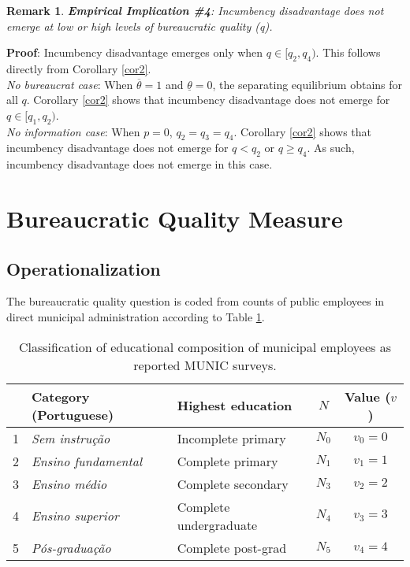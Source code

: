 \documentclass[11pt,english]{article}
\newtheorem{remark}{Remark}
\begin{document}
\begin{remark}
\textbf{Empirical Implication \#4}: Incumbency disadvantage does not emerge at low or high levels of bureaucratic quality (q).
\end{remark}

\textbf{Proof}: Incumbency disadvantage emerges only when $q \in [q_2, q_4)$. This follows directly from Corollary \ref{cor2}. \\

\emph{No bureaucrat case}: When $\overline{\theta} = 1$ and $\underline{\theta} = 0$, the separating equilibrium obtains for all $q$. Corollary \ref{cor2} shows that incumbency disadvantage does not emerge for $q \in [q_1, q_2)$.\\

\emph{No information case}: When $p=0$, $q_2=q_3=q_4$. Corollary \ref{cor2} shows that incumbency disadvantage does not emerge for $q < q_2$ or $q\geq q_4$. As such, incumbency disadvantage does not emerge in this case. 

\section{Bureaucratic Quality Measure}
\subsection{Operationalization}
The bureaucratic quality question is coded from counts of public employees in direct municipal administration according to Table \ref{tab:classification}.
\begin{table}[H]
\centering
\begin{tabular}{lllcc}\hline
& Category (Portuguese) &Highest education & $N$ & Value ($v$)\\ \hline \hline 
1 & \emph{Sem instru\c{c}\~{a}o} & Incomplete primary & $N_0$ & $v_0 = 0$ \\ 
2 & \emph{Ensino fundamental} & Complete primary & $N_1$ & $v_1 = 1$  \\
3 & \emph{Ensino m\'{e}dio} & Complete secondary & $N_3$ & $v_2 = 2$  \\
4 & \emph{Ensino superior} & Complete undergraduate & $N_4$ & $v_3 = 3$  \\
5 & \emph{P\'{o}s-gradua\c{c}\~{a}o} & Complete post-grad & $N_5$ & $v_4 = 4$  \\ \hline
\end{tabular}
\caption{Classification of educational composition of municipal employees as reported MUNIC surveys.} \label{tab:classification}
\end{table}
\end{document}
